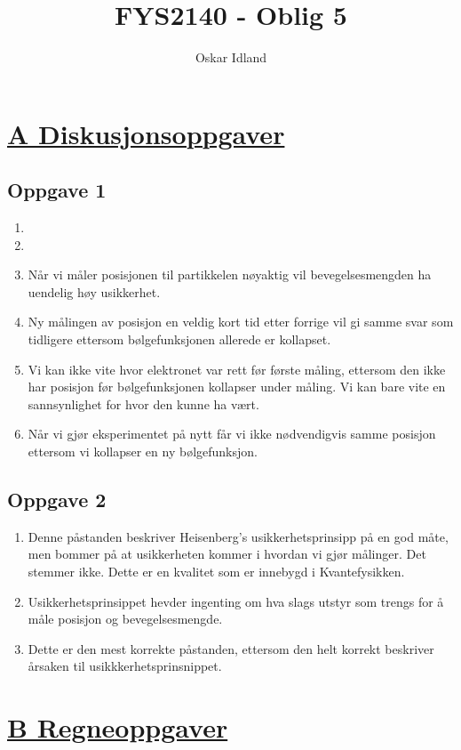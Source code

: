 \documentclass{article}
\author{Oskar Idland}
\title{FYS2140 - Oblig 5}
\date{}
\begin{document}
\maketitle
\newpage

\section*{\underline{A Diskusjonsoppgaver}}
\subsection*{Oppgave 1}
\begin{enumerate}
    \item 
    \item 
    \item Når vi måler posisjonen til partikkelen nøyaktig vil bevegelsesmengden ha uendelig høy usikkerhet. 
    \item Ny målingen av posisjon en veldig kort tid etter forrige vil gi samme svar som tidligere ettersom bølgefunksjonen allerede er kollapset. 
    \item Vi kan ikke vite hvor elektronet var rett før første måling, ettersom den ikke har posisjon før bølgefunksjonen kollapser under måling. Vi kan bare vite en sannsynlighet for hvor den kunne ha vært. 
    \item Når vi gjør eksperimentet på nytt får vi ikke nødvendigvis samme posisjon ettersom vi kollapser en ny bølgefunksjon. 
\end{enumerate}

\subsection*{Oppgave 2}
\begin{enumerate}[A:]
    \item Denne påstanden beskriver Heisenberg's usikkerhetsprinsipp på en god måte, men bommer på at usikkerheten kommer i hvordan vi gjør målinger. Det stemmer ikke. Dette er en kvalitet som er innebygd i Kvantefysikken. 
    \item Usikkerhetsprinsippet hevder ingenting om hva slags utstyr som trengs for å måle posisjon og bevegelsesmengde. 
    \item Dette er den mest korrekte påstanden, ettersom den helt korrekt beskriver årsaken til usikkkerhetsprinsnippet. 
\end{enumerate}


\section*{\underline{B Regneoppgaver}}
\end{document}
